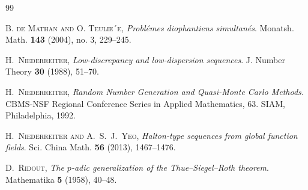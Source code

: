 \documentclass{article}
\renewcommand{\(}{\left (}
\renewcommand{\)}{\right )}
\theoremstyle{definition}
\numberwithin{equation}{section}
\begin{document}
\begin{thebibliography}{99}

 \textsc{B. de Mathan and O. Teulie´{e}}, \textit{Probl\'{e}mes diophantiens simultan\'{e}s}. Monatsh. Math. {\bf143} (2004), no. 3, 229--245. 

\textsc{H.~Niederreiter}, \textit{Low-discrepancy and low-dispersion sequences}.
 { J. Number Theory} {{\bf30}} (1988), 51--70.
	
 \textsc{H.~Niederreiter}, \textit{Random Number Generation and Quasi-Monte
Carlo Methods.} CBMS-NSF Regional Conference Series in Applied Mathematics, 63. SIAM,
Philadelphia, 1992.







 \textsc{H.~Niederreiter and A.~S.~J.~Yeo}, \textit{Halton-type sequences from global function fields}. {{Sci. China Math.}} {\bf56} (2013), 1467--1476. 

 \textsc{D.~Ridout}, \textit{The $p$-adic generalization of the Thue–Siegel–Roth theorem}. Mathematika
{\bf5} (1958), 40--48.


\end{thebibliography}
\end{document}
